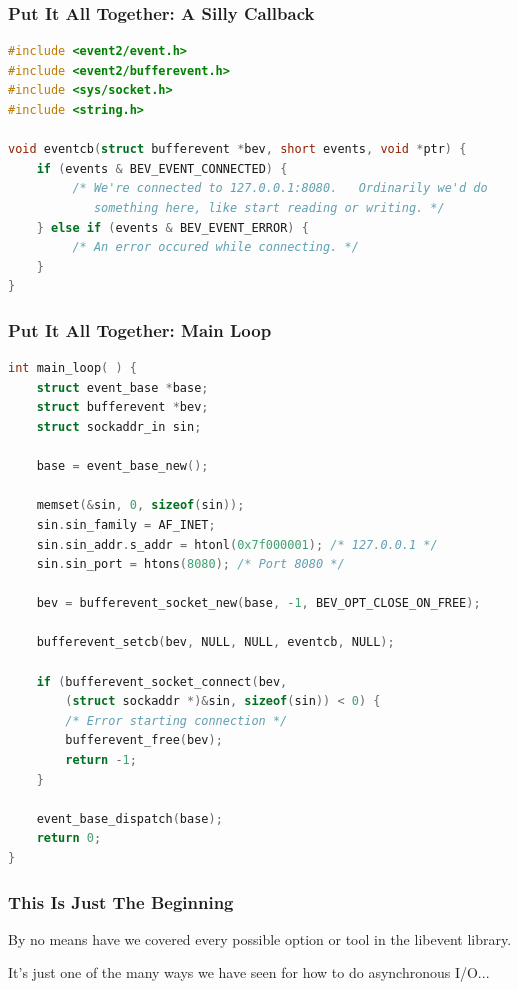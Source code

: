 \begin{frame}[fragile]
	\frametitle{Put It All Together: A Silly Callback}


	\begin{lstlisting}[language=C]
#include <event2/event.h>
#include <event2/bufferevent.h>
#include <sys/socket.h>
#include <string.h>

void eventcb(struct bufferevent *bev, short events, void *ptr) {
    if (events & BEV_EVENT_CONNECTED) {
         /* We're connected to 127.0.0.1:8080.   Ordinarily we'd do
            something here, like start reading or writing. */
    } else if (events & BEV_EVENT_ERROR) {
         /* An error occured while connecting. */
    }
}
\end{lstlisting}

\end{frame}

\begin{frame}[fragile]
	\frametitle{Put It All Together: Main Loop}

	\begin{lstlisting}[language=C]
int main_loop( ) {
    struct event_base *base;
    struct bufferevent *bev;
    struct sockaddr_in sin;

    base = event_base_new();

    memset(&sin, 0, sizeof(sin));
    sin.sin_family = AF_INET;
    sin.sin_addr.s_addr = htonl(0x7f000001); /* 127.0.0.1 */
    sin.sin_port = htons(8080); /* Port 8080 */

    bev = bufferevent_socket_new(base, -1, BEV_OPT_CLOSE_ON_FREE);

    bufferevent_setcb(bev, NULL, NULL, eventcb, NULL);

    if (bufferevent_socket_connect(bev,
        (struct sockaddr *)&sin, sizeof(sin)) < 0) {
        /* Error starting connection */
        bufferevent_free(bev);
        return -1;
    }

    event_base_dispatch(base);
    return 0;
}\end{lstlisting}

\end{frame}


\begin{frame}
	\frametitle{This Is Just The Beginning}

	By no means have we covered every possible option or tool in the libevent library.

	It's just one of the many ways we have seen for how to do asynchronous I/O...


\end{frame}



